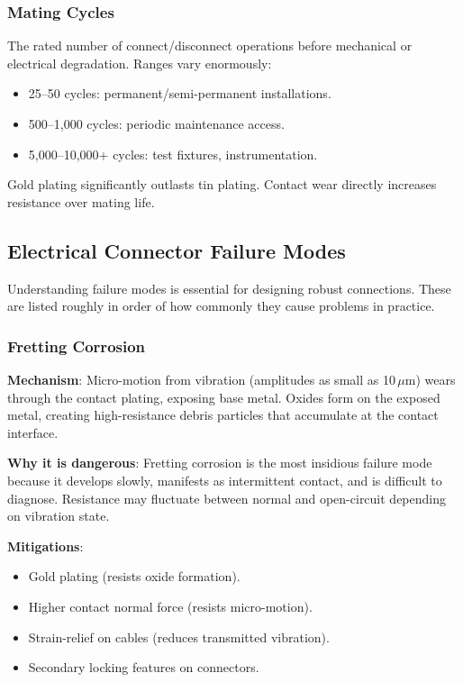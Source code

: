 \subsubsection{Mating Cycles}

The rated number of connect/disconnect operations before mechanical or electrical degradation. Ranges vary enormously:
\begin{itemize}[nosep,leftmargin=1.5em]
  \item 25--50 cycles: permanent/semi-permanent installations.
  \item 500--1,000 cycles: periodic maintenance access.
  \item 5,000--10,000+ cycles: test fixtures, instrumentation.
\end{itemize}
Gold plating significantly outlasts tin plating. Contact wear directly increases resistance over mating life.


\subsection{Electrical Connector Failure Modes}
\label{sec:elecfailure}

Understanding failure modes is essential for designing robust connections. These are listed roughly in order of how commonly they cause problems in practice.

\subsubsection{Fretting Corrosion}

\textbf{Mechanism}: Micro-motion from vibration (amplitudes as small as 10\,$\mu$m) wears through the contact plating, exposing base metal. Oxides form on the exposed metal, creating high-resistance debris particles that accumulate at the contact interface.

\textbf{Why it is dangerous}: Fretting corrosion is the most insidious failure mode because it develops slowly, manifests as intermittent contact, and is difficult to diagnose. Resistance may fluctuate between normal and open-circuit depending on vibration state.

\textbf{Mitigations}:
\begin{itemize}[nosep,leftmargin=1.5em]
  \item Gold plating (resists oxide formation).
  \item Higher contact normal force (resists micro-motion).
  \item Strain-relief on cables (reduces transmitted vibration).
  \item Secondary locking features on connectors.
\end{itemize}

